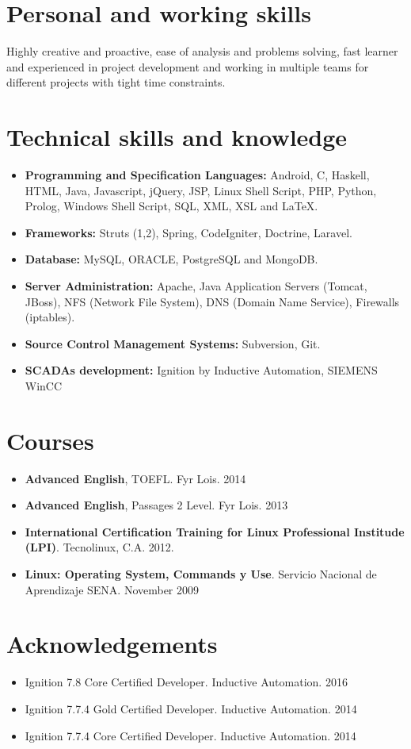 \documentclass[letterpaper,11pt]{report}
\begin{document}
\section*{Personal and working skills}
Highly creative and proactive, ease of analysis and problems solving, fast learner and experienced in project development and working in multiple
teams for different projects with tight time constraints.

\section*{Technical skills and knowledge}
\begin{itemize}
\item \textbf{Programming and Specification Languages:} Android, C, Haskell, HTML, Java, Javascript, jQuery, JSP, Linux Shell Script, PHP, Python, Prolog, Windows Shell Script, SQL, XML, XSL and LaTeX.
\item \textbf{Frameworks:} Struts (1,2), Spring, CodeIgniter, Doctrine, Laravel.
\item \textbf{Database:} MySQL, ORACLE, PostgreSQL and MongoDB.
\item \textbf{Server Administration:} Apache, Java Application Servers (Tomcat, JBoss), NFS (Network File System), DNS (Domain Name Service), Firewalls (iptables).
\item \textbf{Source Control Management Systems:} Subversion, Git.
\item \textbf{SCADAs development:} Ignition by Inductive Automation, SIEMENS WinCC
\end{itemize}

\section*{Courses}
\begin{itemize}
\item \textbf{Advanced English}, TOEFL. Fyr Lois. 2014
\item \textbf{Advanced English}, Passages 2 Level. Fyr Lois. 2013 
\item \textbf{International Certification Training for Linux Professional Institude (LPI)}. Tecnolinux, C.A. 2012.
\item \textbf{Linux: Operating System, Commands y Use}. Servicio Nacional de Aprendizaje SENA. November 2009
\end{itemize}

\section*{Acknowledgements}
\begin{itemize}
    \item Ignition 7.8 Core Certified Developer. Inductive Automation. 2016
    \item Ignition 7.7.4 Gold Certified Developer. Inductive Automation. 2014
    \item Ignition 7.7.4 Core Certified Developer. Inductive Automation. 2014
\end{itemize}
\end{document}
